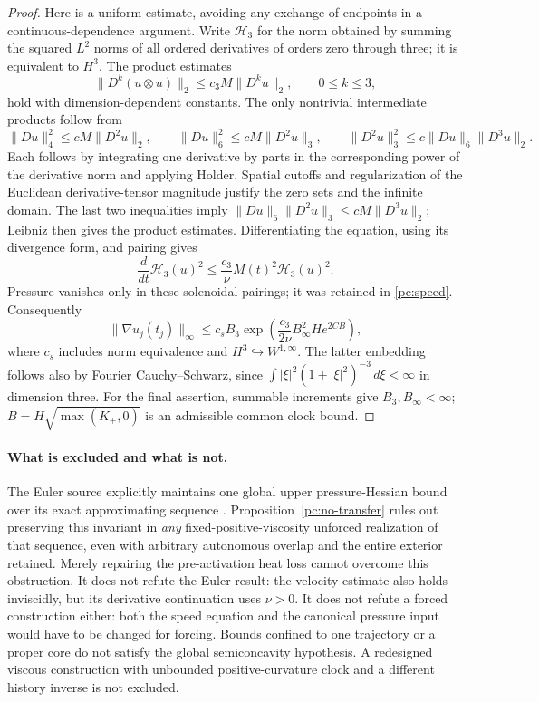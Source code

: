 \begin{proof}
Here is a uniform estimate, avoiding any exchange of endpoints in a
continuous-dependence argument. Write $\mathcal H_3$ for the norm obtained
by summing the squared $L^2$ norms of all ordered derivatives of orders
zero through three; it is equivalent to $H^3$. The product estimates
\[
 \|D^k(u\otimes u)\|_2\le c_3 M\|D^k u\|_2,
 \qquad 0\le k\le3,
\]
hold with dimension-dependent constants. The only nontrivial intermediate
products follow from
\[
 \|Du\|_4^2\le cM\|D^2u\|_2,\qquad
 \|Du\|_6^2\le cM\|D^2u\|_3,\qquad
 \|D^2u\|_3^2\le c\|Du\|_6\|D^3u\|_2.
\]
Each follows by integrating one derivative by parts in the corresponding
power of the derivative norm and applying Holder. Spatial cutoffs and
regularization of the Euclidean derivative-tensor magnitude justify the
zero sets and the infinite domain. The last two inequalities imply
$\|Du\|_6\|D^2u\|_3\le cM\|D^3u\|_2$; Leibniz then gives the product
estimates. Differentiating the equation, using its divergence form, and
pairing gives
\[
 \frac{d}{dt}\mathcal H_3(u)^2
 \le \frac{c_3}{\nu}M(t)^2\mathcal H_3(u)^2.
\]
Pressure vanishes only in these solenoidal pairings; it was retained in
\eqref{pc:speed}. Consequently
\[
 \|\nabla u_j(t_j)\|_\infty
 \le c_s B_3\exp\left(\frac{c_3}{2\nu}
                  B_\infty^2 H e^{2CB}\right),
\]
where $c_s$ includes norm equivalence and $H^3\hookrightarrow W^{1,\infty}$.
The latter embedding follows also by Fourier Cauchy--Schwarz, since
$\int |\xi|^2(1+|\xi|^2)^{-3}\,d\xi<\infty$ in dimension three.
For the final assertion, summable increments give $B_3,B_\infty<\infty$;
$B=H\sqrt{\max(K_+,0)}$ is an admissible common clock bound.
\end{proof}

\paragraph{What is excluded and what is not.}
The Euler source explicitly maintains one global upper pressure-Hessian
bound over its exact approximating sequence \cite{OpenAIEuler2026}.
Proposition~\ref{pc:no-transfer} rules out preserving this invariant in
\emph{any} fixed-positive-viscosity unforced realization of that sequence,
even with arbitrary autonomous overlap and the entire exterior retained.
Merely repairing the pre-activation heat loss cannot overcome this
obstruction. It does not refute the Euler result: the velocity estimate
also holds inviscidly, but its derivative continuation uses $\nu>0$.
It does not refute a forced construction either: both the speed equation
and the canonical pressure input would have to be changed for forcing.
Bounds confined to one trajectory or a proper core do not satisfy the
global semiconcavity hypothesis. A redesigned viscous construction with
unbounded positive-curvature clock and a different history inverse is
not excluded.

